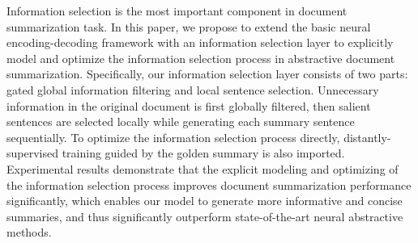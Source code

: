 Information selection is the most important component in document summarization task. In this paper, we propose to extend the basic neural encoding-decoding framework with an information selection layer to explicitly model and optimize the information selection process in abstractive document summarization. Specifically, our information selection layer consists of two parts: gated global information filtering and local sentence selection. Unnecessary information in the original document is first globally filtered, then salient sentences are selected locally while generating each summary sentence sequentially. To optimize the information selection process directly, distantly-supervised training guided by the golden summary is also imported. Experimental results demonstrate that the explicit modeling and optimizing of the information selection process improves document summarization performance significantly, which enables our model to generate more informative and concise summaries, and thus significantly outperform state-of-the-art neural abstractive methods.
